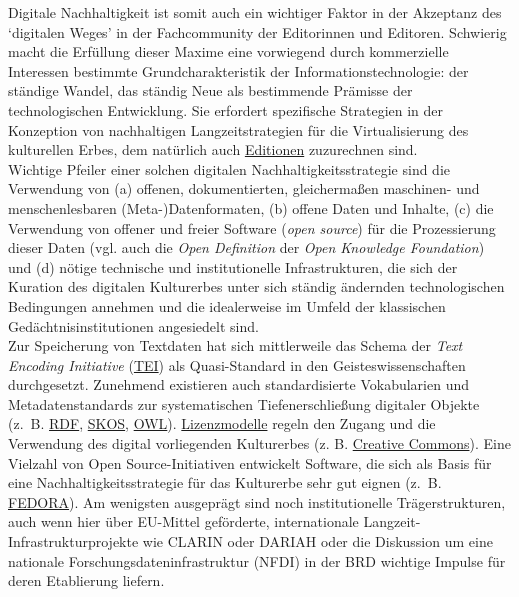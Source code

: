 \documentclass{article}
\begin{document}
        Digitale Nachhaltigkeit ist somit auch ein wichtiger Faktor in der Akzeptanz des ‘digitalen Weges’ in der Fachcommunity der Editorinnen und Editoren. Schwierig macht die Erfüllung dieser Maxime eine vorwiegend durch kommerzielle Interessen bestimmte Grundcharakteristik der Informationstechnologie: der ständige Wandel, das ständig Neue als bestimmende Prämisse der technologischen Entwicklung. Sie erfordert spezifische Strategien in der Konzeption von nachhaltigen Langzeitstrategien für die Virtualisierung des kulturellen Erbes, dem natürlich auch \href{http://gams.uni-graz.at/o:konde.59}{Editionen} zuzurechnen sind.\\
            
        Wichtige Pfeiler einer solchen digitalen Nachhaltigkeitsstrategie sind die Verwendung von (a) offenen, dokumentierten, gleichermaßen maschinen- und menschenlesbaren (Meta-)Datenformaten, (b) offene Daten und Inhalte, (c) die Verwendung von offener und freier Software (\emph{open source}) für die Prozessierung dieser Daten (vgl. auch die \emph{Open Definition} der \emph{Open Knowledge Foundation}) und (d) nötige technische und institutionelle Infrastrukturen, die sich der Kuration des digitalen Kulturerbes unter sich ständig ändernden technologischen Bedingungen annehmen und die idealerweise im Umfeld der klassischen Gedächtnisinstitutionen angesiedelt sind.\\
            
        Zur Speicherung von Textdaten hat sich mittlerweile das Schema der \emph{Text Encoding Initiative} (\href{http://gams.uni-graz.at/o:konde.178}{TEI}) als Quasi-Standard in den Geisteswissenschaften durchgesetzt. Zunehmend existieren auch standardisierte Vokabularien und Metadatenstandards zur systematischen Tiefenerschließung digitaler Objekte (z. B. \href{http://gams.uni-graz.at/o:konde.131}{RDF}, \href{http://gams.uni-graz.at/o:konde.132}{SKOS}, \href{http://gams.uni-graz.at/o:konde.131}{OWL}). \href{http://gams.uni-graz.at/o:konde.9}{Lizenzmodelle} regeln den Zugang und die Verwendung des digital vorliegenden Kulturerbes (z. B. \href{http://gams.uni-graz.at/o:konde.45}{Creative Commons}). Eine Vielzahl von Open Source-Initiativen entwickelt Software, die sich als Basis für eine Nachhaltigkeitsstrategie für das Kulturerbe sehr gut eignen (z. B. \href{http://gams.uni-graz.at/o:konde.69}{FEDORA}). Am wenigsten ausgeprägt sind noch institutionelle Trägerstrukturen, auch wenn hier über EU-Mittel geförderte, internationale Langzeit-Infrastrukturprojekte wie CLARIN oder DARIAH oder die Diskussion um eine nationale Forschungsdateninfrastruktur (NFDI) in der BRD wichtige Impulse für deren Etablierung liefern.\\
            
\end{document}
